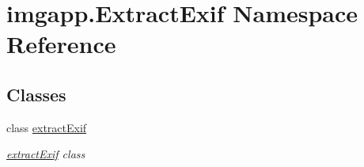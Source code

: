 \hypertarget{namespaceimgapp_1_1ExtractExif}{}\section{imgapp.\+Extract\+Exif Namespace Reference}
\label{namespaceimgapp_1_1ExtractExif}
\subsection*{Classes}
\begin{DoxyCompactItemize}
\item 
class \hyperlink{classimgapp_1_1ExtractExif_1_1extractExif}{extract\+Exif}
\begin{DoxyCompactList}\small\item\em \hyperlink{classimgapp_1_1ExtractExif_1_1extractExif}{extract\+Exif} class \end{DoxyCompactList}\end{DoxyCompactItemize}
